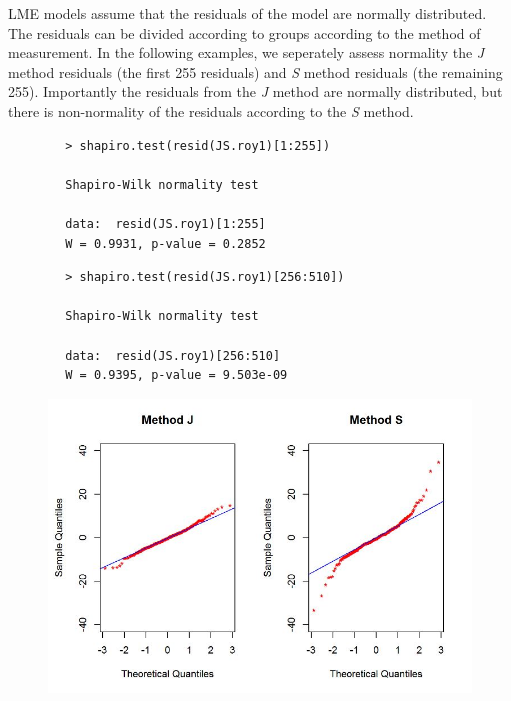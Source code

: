 \documentclass[12pt, a4paper]{report}
\theoremstyle{plain}
\theoremstyle{definition}
\theoremstyle{remark}
\begin{document}
	LME models assume that the residuals of the model are normally distributed.  The residuals can be divided according to groups according to the method of measurement. In the following examples, we seperately assess normality the \textit{J} method residuals (the first 255 residuals) and \textit{S} method residuals (the remaining 255). Importantly the residuals from the \textit{J} method are normally distributed, but there is non-normality of the residuals according to the \textit{S} method.
	\begin{framed}
		\begin{verbatim}
		> shapiro.test(resid(JS.roy1)[1:255])
		
		Shapiro-Wilk normality test
		
		data:  resid(JS.roy1)[1:255]
		W = 0.9931, p-value = 0.2852
		\end{verbatim}
	\end{framed}
	
	\begin{framed}
		\begin{verbatim}
		> shapiro.test(resid(JS.roy1)[256:510])
		
		Shapiro-Wilk normality test
		
		data:  resid(JS.roy1)[256:510]
		W = 0.9395, p-value = 9.503e-09
		\end{verbatim}
	\end{framed}
	\begin{figure}[h!]
		\centering
		\includegraphics[width=0.9\linewidth]{images/Resid-newplot2}
	
	\end{figure}

\end{document}
